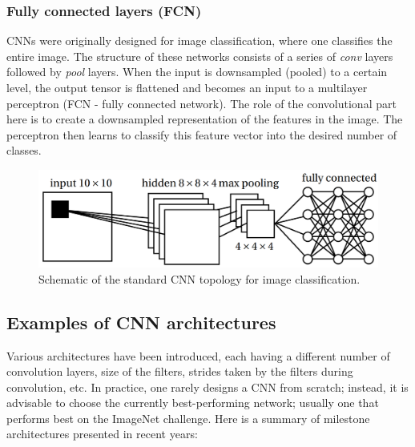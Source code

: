 \subsubsection{Fully connected layers (FCN)}

CNNs were originally designed for image classification, where one classifies the entire image. The structure of these networks consists of a series of \textit{conv} layers followed by \textit{pool} layers. When the input is downsampled (pooled) to a certain level, the output tensor is flattened and becomes an input to a multilayer perceptron (FCN - fully connected network). The role of the convolutional part here is to create a downsampled representation of the features in the image. The perceptron then learns to classify this feature vector into the desired number of classes. \cite{stanford-github} \cite{notes}

\vspace{4mm}
\begin{figure}[htb]
	\begin{center}
		\includegraphics*[width=12cm, keepaspectratio]{obr/fully.png}
	\end{center}
	\vspace{4mm}
	\caption{Schematic of the standard CNN topology for image classification. \cite{mehlig}} 
	\label{pool}
\end{figure}

\subsection{Examples of CNN architectures}

Various architectures have been introduced, each having a different number of convolution layers, size of the filters, strides taken by the filters during convolution, etc. In practice, one rarely designs a CNN from scratch; instead, it is advisable to choose the currently best-performing network; usually one that performs best on the ImageNet challenge. \cite{stanford-github} Here is a summary of milestone architectures presented in recent years:

